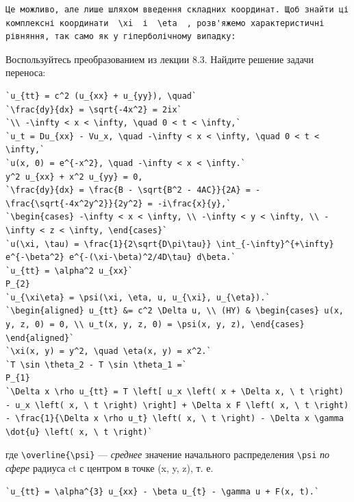 \documentclass[
  ukrainian,
]{article}
\begin{document}
\begin{verbatim}
Це можливо, але лише шляхом введення складних координат. Щоб знайти ці комплексні координати  \xi  і  \eta  , розв'яжемо характеристичні рівняння, так само як у гіперболічному випадку:
\end{verbatim}

Воспользуйтесь преобразованием из лекции 8.3. Найдите решение задачи
переноса:

\begin{verbatim}
`u_{tt} = c^2 (u_{xx} + u_{yy}), \quad`
`\frac{dy}{dx} = \sqrt{-4x^2} = 2ix`
`\\ -\infty < x < \infty, \quad 0 < t < \infty,`
`u_t = Du_{xx} - Vu_x, \quad -\infty < x < \infty, \quad 0 < t < \infty,`
`u(x, 0) = e^{-x^2}, \quad -\infty < x < \infty.`
y^2 u_{xx} + x^2 u_{yy} = 0,
`\frac{dy}{dx} = \frac{B - \sqrt{B^2 - 4AC}}{2A} = -\frac{\sqrt{-4x^2y^2}}{2y^2} = -i\frac{x}{y},`
`\begin{cases} -\infty < x < \infty, \\ -\infty < y < \infty, \\ -\infty < z < \infty, \end{cases}`
`u(\xi, \tau) = \frac{1}{2\sqrt{D\pi\tau}} \int_{-\infty}^{+\infty} e^{-\beta^2} e^{-(\xi-\beta)^2/4D\tau} d\beta.`
`u_{tt} = \alpha^2 u_{xx}`
P_{2}
`u_{\xi\eta} = \psi(\xi, \eta, u, u_{\xi}, u_{\eta}).`
`\begin{aligned} u_{tt} &= c^2 \Delta u, \\ (HY) & \begin{cases} u(x, y, z, 0) = 0, \\ u_t(x, y, z, 0) = \psi(x, y, z), \end{cases} \end{aligned}`
`\xi(x, y) = y^2, \quad \eta(x, y) = x^2.`
`T \sin \theta_2 - T \sin \theta_1 =`
P_{1}
`\Delta x \rho u_{tt} = T \left[ u_x \left( x + \Delta x, \ t \right) - u_x \left( x, \ t \right) \right] + \Delta x F \left( x, \ t \right) - \frac{1}{\Delta x \rho u_t} \left( x, \ t \right) - \Delta x \gamma \dot{u} \left( x, \ t \right)`
\end{verbatim}

где \texttt{\textbackslash{}overline\{\textbackslash{}psi\}} ---
\emph{среднее} значение начального распределения
\texttt{\textbackslash{}psi} \emph{по сфере} радиуса ct с центром в
точке (x, y, z), т. е.

\begin{verbatim}
`u_{tt} = \alpha^{3} u_{xx} - \beta u_{t} - \gamma u + F(x, t).`
\end{verbatim}
\end{document}
